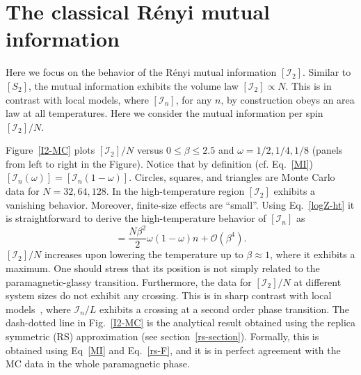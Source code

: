\documentclass[twocolumn,superscriptaddress,prb,10pt]{revtex4-1}
\begin{document}
\section{The classical R\'enyi mutual information}
\label{I2-section}

Here we focus on the behavior of the R\'enyi mutual information $[{\mathcal I}_2]$. 
Similar to $[S_2]$, the mutual information exhibits the volume law $[{\mathcal I}_2]
\propto N$. This is in contrast with local models, where $[{\mathcal I}_n]$, for any 
$n$, by construction obeys an area law at all temperatures. Here we consider the 
mutual information per spin $[{\mathcal I}_2]/N$. 

Figure~\ref{I2-MC} plots $[{\mathcal I}_2]/N$ versus $0\le\beta\le 2.5$ and $\omega=1/2,1/4,
1/8$ (panels from left to right in the Figure). Notice that by definition (cf. Eq.~\eqref{MI}) 
$[{\mathcal I}_n(\omega)]=[{\mathcal I}_n(1-\omega)]$. Circles, squares, and triangles  
are Monte Carlo data for $N=32,64,128$. In the high-temperature region $[{\mathcal I}_2]$ 
exhibits a vanishing behavior. Moreover, finite-size effects are ``small''. Using Eq.~\eqref{logZ-ht} 
it is straightforward to derive the high-temperature behavior of $[{\mathcal I}_n]$ as  
%
\begin{equation}
[{\mathcal I}_n]=\frac{N\beta^2}{2}\omega(1-\omega)n+{\mathcal O}
(\beta^4).
\end{equation}
%
$[{\mathcal I}_2]/N$ increases upon lowering the temperature up to $\beta\approx 1$, where 
it exhibits a maximum.  
One should stress that its position is not simply related to the paramagnetic-glassy transition. 
Furthermore, the data for $[{\mathcal I}_2]/N$ at different system sizes do not exhibit any crossing. 
This is in sharp contrast with local models~\cite{jaconis-2013}, where ${\mathcal I}_n/L$ exhibits a 
crossing at a second order phase transition. The dash-dotted line in Fig.~\ref{I2-MC} is the 
analytical result obtained using the replica symmetric (RS) approximation (see 
section~\ref{rs-section}). Formally, this is obtained using Eq~\eqref{MI} and Eq.~\eqref{rs-F}, 
and it is in perfect agreement with the MC data in the whole paramagnetic phase.  
\end{document}
